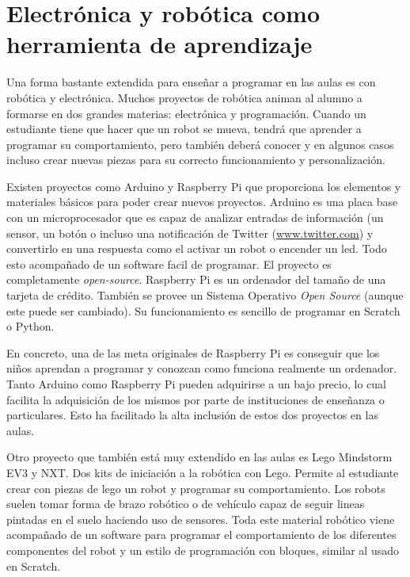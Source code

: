 \section{Electrónica y robótica como herramienta de aprendizaje}
\label{sec:electronica-robotica}


Una forma bastante extendida para enseñar a programar en las aulas es con robótica y electrónica. Muchos proyectos de robótica animan al alumno a formarse en dos grandes materias: electrónica y programación. Cuando un estudiante tiene que hacer que un robot se mueva, tendrá que aprender a programar su comportamiento, pero también deberá conocer y en algunos casos incluso crear nuevas piezas para su correcto funcionamiento y personalización.

Existen proyectos como Arduino\cite{arduino} y Raspberry Pi\cite{raspberry-pi} que proporciona los elementos y materiales básicos para poder crear nuevos proyectos. Arduino es una placa base con un microprocesador que es capaz de analizar entradas de información (un sensor, un botón o incluso una notificación de Twitter (\url{www.twitter.com}) y convertirlo en una respuesta como el activar un robot o encender un led. Todo esto acompañado de un software facil de programar. El proyecto es completamente \emph{\gls{open-source}}. Raspberry Pi es un ordenador del tamaño de una tarjeta de crédito. También se provee un Sistema Operativo \emph{Open Source} (aunque este puede ser cambiado). Su funcionamiento es sencillo de programar en Scratch\cite{scratch} o Python\cite{python,lutz2013learning}.

En concreto, una de las meta originales de Raspberry Pi es conseguir que los niños aprendan a programar y conozcan como funciona realmente un ordenador. Tanto Arduino como Raspberry Pi pueden adquirirse a un bajo precio, lo cual facilita la adquisición de los mismos por parte de instituciones de enseñanza o particulares. Esto ha facilitado la alta inclusión de estos dos proyectos en las aulas.

Otro proyecto que también está muy extendido en las aulas es Lego Mindstorm EV3 y NXT\cite{lego-mindstorm}. Dos kits de iniciación a la robótica con Lego. Permite al estudiante crear con piezas de lego un robot y programar su comportamiento. Los robots suelen tomar forma de brazo robótico o de vehículo capaz de seguir lineas pintadas en el suelo haciendo uso de sensores. Toda este material robótico viene acompañado de un software para programar el comportamiento de los diferentes componentes del robot y un estilo de programación con bloques\cite{lego-mindstorm-programar}, similar al usado en Scratch.

